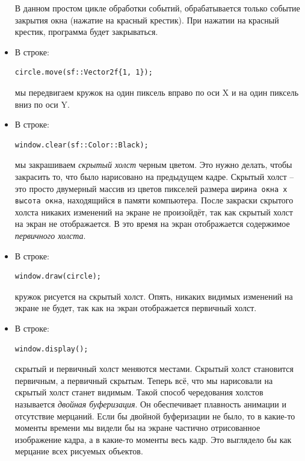 \documentclass{article}
\begin{document}
\begin{itemize}
В данном простом цикле обработки событий, обрабатывается только событие закрытия окна (нажатие на красный крестик). При нажатии на красный крестик, программа будет закрываться.

\item В строке:
\begin{lstlisting}
circle.move(sf::Vector2f{1, 1});
\end{lstlisting}
мы передвигаем кружок на один пиксель вправо по оси X и на один пиксель вниз по оси Y.

\item В строке:
\begin{lstlisting}
window.clear(sf::Color::Black);
\end{lstlisting}
мы закрашиваем \textit{скрытый холст} черным цветом. Это нужно делать, чтобы закрасить то, что было нарисовано на предыдущем кадре. Скрытый холст -- это просто двумерный массив из цветов пикселей размера \texttt{ширина окна x высота окна}, находящийся в памяти компьютера. После закраски скрытого холста никаких изменений на экране не произойдёт, так как скрытый холст на экран не отображается. В это время на экран отображается содержимое \textit{первичного холста}.


\item В строке:
\begin{lstlisting}
window.draw(circle);
\end{lstlisting}
кружок рисуется на скрытый холст. Опять, никаких видимых изменений на экране не будет, так как на экран отображается первичный холст.

\item В строке:
\begin{lstlisting}
window.display();
\end{lstlisting}
скрытый и первичный холст меняются местами. Скрытый холст становится первичным, а первичный скрытым. Теперь всё, что мы нарисовали на скрытый холст станет видимым. Такой способ чередования холстов называется \textit{двойная буферизация}. Он обеспечивает плавность анимации и отсутствие мерцаний. Если бы двойной буферизации не было, то в какие-то моменты времени мы видели бы на экране частично отрисованное изображение кадра, а в какие-то моменты весь кадр. Это выглядело бы как мерцание всех рисуемых объектов.



\end{itemize}
\newpage
\end{document}
